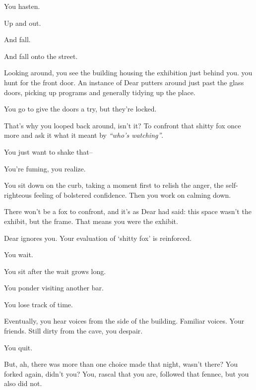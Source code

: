 \newpage

\null
\vspace{0.5in}

You hasten.

\newpage

Up and out.

\newpage

\null
\vfill

\begin{flushright}
  And fall.
\end{flushright}


\newpage

And fall onto the street.

Looking around, you see the building housing the exhibition just behind you. you hunt for the front door. An instance of Dear putters around just past the glass doors, picking up programs and generally tidying up the place.

You go to give the doors a try, but they're locked.

That's why you looped back around, isn't it? To confront that shitty fox once more and ask it what it meant by \emph{``who's watching''}.

You just want to shake that--

You're fuming, you realize.

You sit down on the curb, taking a moment first to relish the anger, the self-righteous feeling of bolstered confidence. Then you work on calming down.

There won't be a fox to confront, and it's as Dear had said: this space wasn't the exhibit, but the frame. That means you were the exhibit.

Dear ignores you. Your evaluation of `shitty fox' is reinforced.

You wait.

You sit after the wait grows long.

You ponder visiting another bar.

You lose track of time.

Eventually, you hear voices from the side of the building. Familiar voices. Your friends. Still dirty from the cave, you despair.

You quit.

\vfill

\newpage
\null
\newpage
\null

\newpage

But, ah, there was more than one choice made that night, wasn't there? You forked again, didn't you? You, rascal that you are, followed that fennec, but you also did not.

